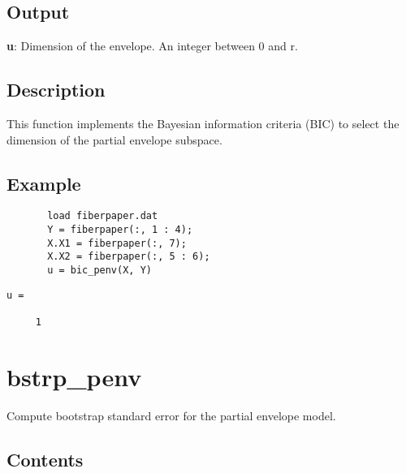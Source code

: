 \documentclass[a4paper,11pt,openany]{memoir}
\begin{document}
\subsection*{Output}

\begin{par}
\textbf{u}: Dimension of the envelope. An integer between 0 and r.
\end{par} \vspace{1em}


\subsection*{Description}

\begin{par}
This function implements the Bayesian information criteria (BIC) to select the dimension of the partial envelope subspace.
\end{par} \vspace{1em}


\subsection*{Example}


\begin{verbatim}       load fiberpaper.dat
       Y = fiberpaper(:, 1 : 4);
       X.X1 = fiberpaper(:, 7);
       X.X2 = fiberpaper(:, 5 : 6);
       u = bic_penv(X, Y)\end{verbatim}
    
        \color{lightgray}\ttfamily \begin{verbatim}
u =

     1

\end{verbatim} \rmfamily
\color{black}
    
\newpage


\rmfamily
\color{black}\section{bstrp\_penv}

\begin{par}
Compute bootstrap standard error for the partial envelope model.
\end{par} \vspace{1em}

\subsection*{Contents}
\end{document}

